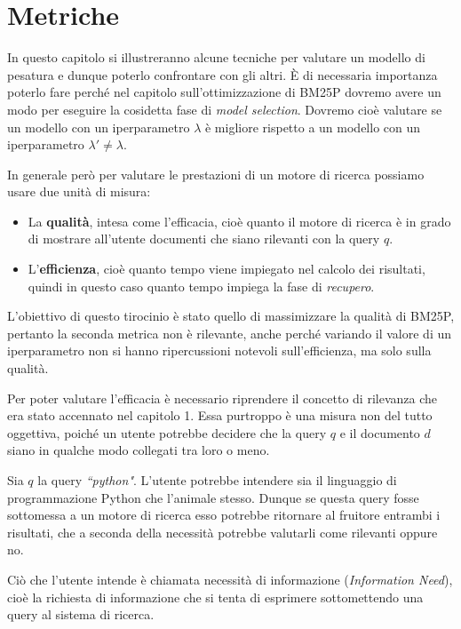 \chapter{Metriche}

In questo capitolo si  illustreranno alcune tecniche 
per valutare un modello di pesatura e dunque poterlo confrontare con gli altri.
\`E di necessaria importanza poterlo fare perché nel capitolo sull'ottimizzazione di BM25P dovremo avere un modo per eseguire
la cosidetta fase di \textit{model selection}. Dovremo cioè valutare se un modello con un iperparametro $\lambda$ è
migliore rispetto a un modello con un iperparametro $\lambda' \neq \lambda$.

In generale però per valutare le prestazioni di un motore di ricerca possiamo usare due unità di misura:

\begin{itemize}
	\item La \textbf{qualità}, intesa come l'efficacia, cioè quanto il motore di ricerca
	è in grado di mostrare all'utente documenti che siano rilevanti con la query $q$.
	\item L'\textbf{efficienza}, cioè quanto tempo viene impiegato nel calcolo dei risultati, quindi in questo caso
	quanto tempo impiega la fase di \textit{recupero}.
\end{itemize}

L'obiettivo di questo tirocinio è stato quello di massimizzare la qualità di BM25P, pertanto
la seconda metrica non è rilevante, anche perché variando il valore di un iperparametro
non si hanno ripercussioni notevoli sull'efficienza, ma solo sulla qualità.

Per poter valutare l'efficacia è necessario riprendere il concetto di rilevanza  che era stato
accennato nel capitolo 1. Essa purtroppo è una misura non del tutto oggettiva,
poiché un utente potrebbe decidere che la query $q$ e il documento $d$ siano
in qualche modo collegati tra loro o meno.

\begin{esempio}
	Sia $q$ la query \textit{``python"}. L'utente potrebbe intendere sia il linguaggio di programmazione Python
	che l'animale stesso. Dunque se questa query fosse sottomessa a un motore di ricerca
	esso potrebbe ritornare al fruitore entrambi i risultati, che a seconda della necessità
	potrebbe valutarli come rilevanti oppure no.
\end{esempio}

Ciò che l'utente intende è chiamata necessità di informazione (\textit{Information Need}), cioè la richiesta di informazione
che si tenta di esprimere sottomettendo una query al sistema di ricerca.

